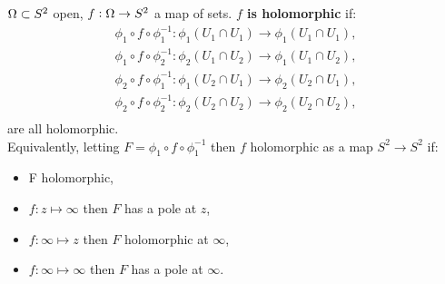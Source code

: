 \begin{definition}

$\Omega \subset S^2$ open, $f:\Omega \to S^2$ a map of sets. \textbf{$f$ is holomorphic} if:
\begin{align*}
    \phi_1 \circ f \circ \phi_1^{-1} : \phi_1 \left( U_1 \cap U_1 \right) \to \phi_1 \left( U_1 \cap U_1\right),\\
    \phi_1 \circ f \circ \phi_2^{-1} : \phi_2 \left( U_1 \cap U_2 \right) \to \phi_1 \left( U_1 \cap U_2\right),\\
    \phi_2 \circ f \circ \phi_1^{-1} : \phi_1 \left( U_2 \cap U_1 \right) \to \phi_2 \left( U_2 \cap U_1\right),\\
    \phi_2 \circ f \circ \phi_2^{-1} : \phi_2 \left( U_2 \cap U_2 \right) \to \phi_2 \left( U_2 \cap U_2\right),\\
\end{align*}
are all holomorphic.\\

Equivalently, letting $F= \phi_1 \circ f \circ \phi_1^{-1}$ then $f$ holomorphic as a map $S^2 \to S^2$ if:
\begin{itemize}
    \item F holomorphic,
    \item $f:z \mapsto \infty$ then $F$ has a pole at $z$,
    \item $f:\infty \mapsto z$ then $F$ holomorphic at $\infty$,
    \item $f: \infty \mapsto \infty$ then $F$ has a pole at $\infty$.
\end{itemize}
\end{definition}










